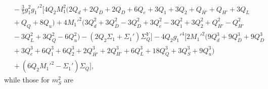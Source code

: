 \documentclass[preprint,amsmath,amssymb,aps,superscriptaddress,prd,showpacs,floatfix,nofootinbib]{revtex4-1}
\begin{document}
\begin{subequations}
\begin{align}
&{}-\frac{3}{5}g_1^2g_1'^2\Big [ 4Q_2M_1^2\big ( 2Q_d+2Q_{\overline{D}}+2Q_D+6Q_e+3Q_1+3Q_2+Q_{\overline{H'}}+Q_{H'}+3Q_L\nonumber\\
&{}+Q_Q+8Q_u\big )+4M_1'^2\big ( 3Q_d^2+3Q_{\overline{D}}^2-3Q_D^2+3Q_e^2-3Q_1^2+3Q_2^2+Q_{\overline{H'}}^2-Q_{H'}^2\nonumber\\
&{}-3Q_L^2+3Q_Q^2-6Q_u^2\big )-\left ( 2Q_2\Sigma_1+\Sigma_1'\right )\Sigma_Q^Y\Big ]-4Q_2g_1'^4\Big [ 2M_1'^2\big ( 9Q_d^3+9Q_{\overline{D}}^3+9Q_D^3\nonumber\\
&{}+3Q_e^3+6Q_1^3+6Q_2^3+2Q_{\overline{H'}}^3+2Q_{H'}^3+6Q_L^3+18Q_Q^3+3Q_S^3+9Q_u^3\big )\nonumber\\
&{}+\left ( 6Q_2M_1'^2-\Sigma_1'\right )\Sigma_Q\Big ],\label{eq:USSMmHu2Ot2Coeff}
\end{align}
\end{subequations}
while those for $m_S^2$ are
\end{document}
